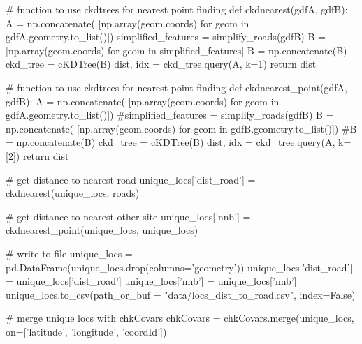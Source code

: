 \documentclass[]{article}
\newenvironment{Shaded}{}{}
\newcommand{\CommentTok}[1]{\textcolor[rgb]{0.00,0.50,0.00}{#1}}
\newcommand{\ControlFlowTok}[1]{\textcolor[rgb]{0.00,0.00,1.00}{#1}}
\newcommand{\DecValTok}[1]{#1}
\newcommand{\KeywordTok}[1]{\textcolor[rgb]{0.00,0.00,1.00}{#1}}
\newcommand{\NormalTok}[1]{#1}
\newcommand{\OperatorTok}[1]{#1}
\newcommand{\StringTok}[1]{\textcolor[rgb]{0.00,0.50,0.50}{#1}}
\newcommand{\VariableTok}[1]{#1}
\begin{document}
\begin{Shaded}
\begin{Highlighting}[]
\CommentTok{# function to use ckdtrees for nearest point finding}
\KeywordTok{def}\NormalTok{ ckdnearest(gdfA, gdfB):}
\NormalTok{    A }\OperatorTok{=}\NormalTok{ np.concatenate(}
\NormalTok{    [np.array(geom.coords) }\ControlFlowTok{for}\NormalTok{ geom }\KeywordTok{in}\NormalTok{ gdfA.geometry.to_list()])}
\NormalTok{    simplified_features }\OperatorTok{=}\NormalTok{ simplify_roads(gdfB)}
\NormalTok{    B }\OperatorTok{=}\NormalTok{ [np.array(geom.coords) }\ControlFlowTok{for}\NormalTok{ geom }\KeywordTok{in}\NormalTok{ simplified_features]}
\NormalTok{    B }\OperatorTok{=}\NormalTok{ np.concatenate(B)}
\NormalTok{    ckd_tree }\OperatorTok{=}\NormalTok{ cKDTree(B)}
\NormalTok{    dist, idx }\OperatorTok{=}\NormalTok{ ckd_tree.query(A, k}\OperatorTok{=}\DecValTok{1}\NormalTok{)}
    \ControlFlowTok{return}\NormalTok{ dist}


\CommentTok{# function to use ckdtrees for nearest point finding}
\KeywordTok{def}\NormalTok{ ckdnearest_point(gdfA, gdfB):}
\NormalTok{    A }\OperatorTok{=}\NormalTok{ np.concatenate(}
\NormalTok{    [np.array(geom.coords) }\ControlFlowTok{for}\NormalTok{ geom }\KeywordTok{in}\NormalTok{ gdfA.geometry.to_list()])}
    \CommentTok{#simplified_features = simplify_roads(gdfB)}
\NormalTok{    B }\OperatorTok{=}\NormalTok{ np.concatenate(}
\NormalTok{    [np.array(geom.coords) }\ControlFlowTok{for}\NormalTok{ geom }\KeywordTok{in}\NormalTok{ gdfB.geometry.to_list()])}
    \CommentTok{#B = np.concatenate(B)}
\NormalTok{    ckd_tree }\OperatorTok{=}\NormalTok{ cKDTree(B)}
\NormalTok{    dist, idx }\OperatorTok{=}\NormalTok{ ckd_tree.query(A, k}\OperatorTok{=}\NormalTok{[}\DecValTok{2}\NormalTok{])}
    \ControlFlowTok{return}\NormalTok{ dist}


\CommentTok{# get distance to nearest road}
\NormalTok{unique_locs[}\StringTok{'dist_road'}\NormalTok{] }\OperatorTok{=}\NormalTok{ ckdnearest(unique_locs, roads)}

\CommentTok{# get distance to nearest other site}
\NormalTok{unique_locs[}\StringTok{'nnb'}\NormalTok{] }\OperatorTok{=}\NormalTok{ ckdnearest_point(unique_locs, unique_locs)}

\CommentTok{# write to file}
\NormalTok{unique_locs }\OperatorTok{=}\NormalTok{ pd.DataFrame(unique_locs.drop(columns}\OperatorTok{=}\StringTok{'geometry'}\NormalTok{))}
\NormalTok{unique_locs[}\StringTok{'dist_road'}\NormalTok{] }\OperatorTok{=}\NormalTok{ unique_locs[}\StringTok{'dist_road'}\NormalTok{]}
\NormalTok{unique_locs[}\StringTok{'nnb'}\NormalTok{] }\OperatorTok{=}\NormalTok{ unique_locs[}\StringTok{'nnb'}\NormalTok{]}
\NormalTok{unique_locs.to_csv(path_or_buf }\OperatorTok{=} \StringTok{"data/locs_dist_to_road.csv"}\NormalTok{, index}\OperatorTok{=}\VariableTok{False}\NormalTok{)}

\CommentTok{# merge unique locs with chkCovars}
\NormalTok{chkCovars }\OperatorTok{=}\NormalTok{ chkCovars.merge(unique_locs, on}\OperatorTok{=}\NormalTok{[}\StringTok{'latitude'}\NormalTok{, }
                                             \StringTok{'longitude'}\NormalTok{, }\StringTok{'coordId'}\NormalTok{])}
\end{Highlighting}
\end{Shaded}
\end{document}
